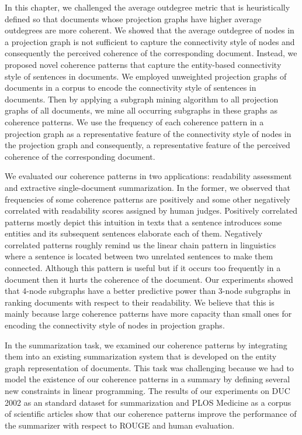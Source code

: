 In this chapter, we challenged the average outdegree metric that is heuristically defined so that documents whose projection graphs have higher average outdegrees are more coherent. 
We showed that the average outdegree of nodes in a projection graph is not sufficient to capture the connectivity style of nodes and consequently the perceived coherence of the corresponding document. 
Instead, we proposed novel coherence patterns that capture the entity-based connectivity style of sentences in documents. 
We employed unweighted projection graphs of documents in a corpus to encode the connectivity style of sentences in documents.  
Then by applying a subgraph mining algorithm to all projection graphs of all documents, we mine all occurring subgraphs in these graphs as coherence patterns. 
We use the frequency of each coherence pattern in a projection graph as a representative feature of the connectivity style of nodes in the projection graph and consequently, a representative feature of the perceived coherence of the corresponding document. 

We evaluated our coherence patterns in two applications: readability assessment and extractive \mbox{single-document} summarization. 
In the former, we observed that frequencies of some coherence patterns are positively and some other negatively correlated with readability scores assigned by human judges. 
Positively correlated patterns mostly depict this intuition in texts that a sentence introduces some entities and its subsequent sentences elaborate each of them.  
Negatively correlated patterns roughly remind us the linear chain pattern in linguistics where a sentence is located between two unrelated sentences to make them connected. 
Although this pattern is useful but if it occurs too frequently in a document then it hurts the coherence of the document. 
Our experiments showed that 4-node subgraphs have a better predictive power than  3-node subgraphs in ranking documents with respect to their readability. 
We believe that this is mainly because large coherence patterns have more capacity than small ones for encoding the connectivity style of nodes in projection graphs. 

In the summarization task, we examined our coherence patterns by integrating them into an existing summarization system that is developed on the entity graph representation of documents. 
This task was challenging  because we had to model the existence of our coherence patterns in a summary by defining several new constraints in linear programming.  
The results of our experiments on DUC 2002 as an standard dataset for summarization and PLOS Medicine as a corpus of scientific articles show that our coherence patterns improve the performance of the summarizer with respect to ROUGE and human evaluation. 


